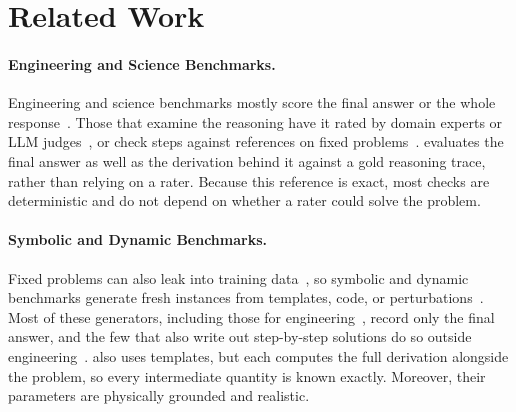 \section{Related Work}
\label{sec:related}

\paragraph{Engineering and Science Benchmarks.} Engineering and science benchmarks mostly score the
final answer or the whole
response~\citep{zhou2025engibench, naser2026eri, li2025eeebench, qiu2025phybench}.
Those that examine the reasoning have it rated by domain experts or LLM
judges~\citep{syed2024transportbench, zheng2026tpscalcbench, wasiq2026engvqa}, or check steps
against references on fixed problems~\citep{duzkar2026thermoqa, zhao2026prismphysics}.
\ourdataset evaluates the final answer as well as the derivation behind it against a gold reasoning
trace, rather than relying on a rater.
Because this reference is exact, most checks are deterministic and do not depend on whether a rater
could solve the problem.

\paragraph{Symbolic and Dynamic Benchmarks.} Fixed problems can also leak into training
data~\citep{zhang2024gsm1k}, so symbolic and dynamic benchmarks generate fresh instances from
templates, code, or perturbations~\citep{mirzadeh2024gsmsymbolic, zhu2024dyval, li2024gsmplus}.
Most of these generators, including those for
engineering~\citep{skelic2025circuit, chen2026optengine}, record only the final answer, and the few
that also write out step-by-step solutions do so outside
engineering~\citep{fan2024hardmath, imani2025sympybench, xie2025finchain}.
\ourdataset also uses templates, but each computes the full derivation alongside the problem, so
every intermediate quantity is known exactly.
Moreover, their parameters are physically grounded and realistic.

